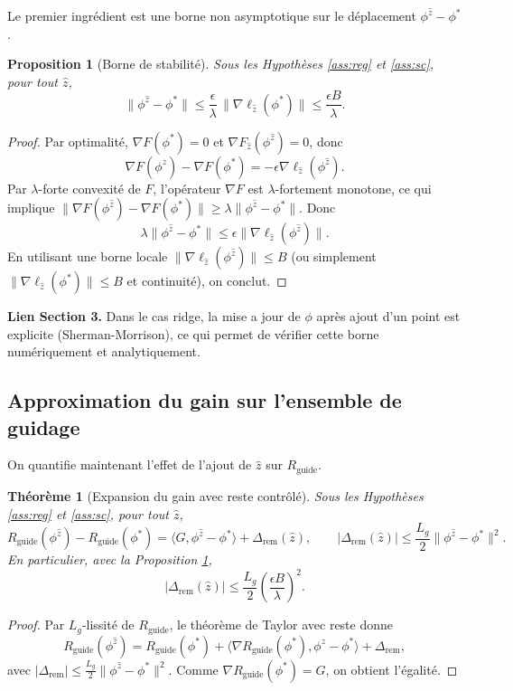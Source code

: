 \documentclass[11pt]{article}
\newtheorem{theorem}{Théorème}
\newtheorem{proposition}{Proposition}
\begin{document}
Le premier ingrédient est une borne non asymptotique sur le déplacement $\phi^{\hat z}-\phi^*$.

\begin{proposition}[Borne de stabilité]
\label{prop:stab}
Sous les Hypothèses \ref{ass:reg} et \ref{ass:sc}, pour tout $\hat z$,
\[
\|\phi^{\hat z}-\phi^*\|
\le \frac{\epsilon}{\lambda}\,\|\nabla \ell_{\hat z}(\phi^*)\|
\le \frac{\epsilon B}{\lambda}.
\]
\end{proposition}

\begin{proof}
Par optimalité, $\nabla F(\phi^*)=0$ et $\nabla F_{\hat z}(\phi^{\hat z})=0$, donc
\[
\nabla F(\phi^{\hat z}) - \nabla F(\phi^*) = -\epsilon \nabla \ell_{\hat z}(\phi^{\hat z}).
\]
Par $\lambda$-forte convexité de $F$, l'opérateur $\nabla F$ est $\lambda$-fortement monotone, ce qui implique
$\|\nabla F(\phi^{\hat z})-\nabla F(\phi^*)\|\ge \lambda\|\phi^{\hat z}-\phi^*\|$.
Donc
\[
\lambda\|\phi^{\hat z}-\phi^*\|\le \epsilon\|\nabla \ell_{\hat z}(\phi^{\hat z})\|.
\]
En utilisant une borne locale $\|\nabla \ell_{\hat z}(\phi^{\hat z})\|\le B$ (ou simplement $\|\nabla \ell_{\hat z}(\phi^*)\|\le B$ et continuité), on conclut.
\end{proof}

\noindent\textbf{Lien Section 3.}
Dans le cas ridge, la mise a jour de $\phi$ après ajout d'un point est explicite (Sherman-Morrison), ce qui permet de vérifier cette borne numériquement et analytiquement.

\subsection{Approximation du gain sur l'ensemble de guidage}

On quantifie maintenant l'effet de l'ajout de $\hat z$ sur $R_{\text{guide}}$.

\begin{theorem}[Expansion du gain avec reste contrôlé]
\label{thm:gain}
Sous les Hypothèses \ref{ass:reg} et \ref{ass:sc}, pour tout $\hat z$,
\[
R_{\text{guide}}(\phi^{\hat z}) - R_{\text{guide}}(\phi^*)
=
\langle G,\phi^{\hat z}-\phi^*\rangle + \Delta_{\text{rem}}(\hat z),
\qquad
|\Delta_{\text{rem}}(\hat z)| \le \frac{L_g}{2}\|\phi^{\hat z}-\phi^*\|^2.
\]
En particulier, avec la Proposition \ref{prop:stab},
\[
|\Delta_{\text{rem}}(\hat z)| \le \frac{L_g}{2}\left(\frac{\epsilon B}{\lambda}\right)^2.
\]
\end{theorem}

\begin{proof}
Par $L_g$-lissité de $R_{\text{guide}}$, le théorème de Taylor avec reste donne
\[
R_{\text{guide}}(\phi^{\hat z}) = R_{\text{guide}}(\phi^*) + \langle \nabla R_{\text{guide}}(\phi^*), \phi^{\hat z}-\phi^*\rangle + \Delta_{\text{rem}},
\]
avec $|\Delta_{\text{rem}}|\le \frac{L_g}{2}\|\phi^{\hat z}-\phi^*\|^2$.
Comme $\nabla R_{\text{guide}}(\phi^*)=G$, on obtient l'égalité.
\end{proof}
\end{document}
